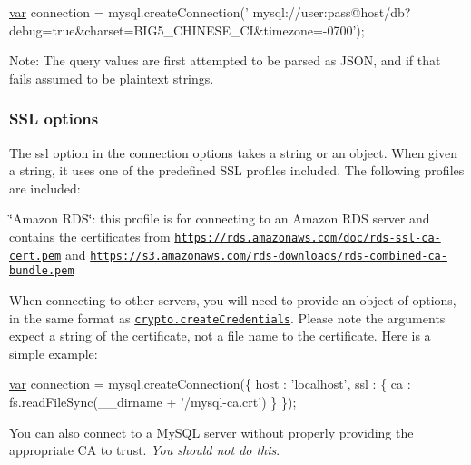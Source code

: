 \begin{DoxyCode}
\hyperlink{018__def_8c_a335628f2e9085305224b4f9cc6e95ed5}{var} connection = mysql.createConnection(\textcolor{stringliteral}{'
      mysql://user:pass@host/db?debug=true&charset=BIG5\_CHINESE\_CI&timezone=-0700'});
\end{DoxyCode}


Note\+: The query values are first attempted to be parsed as J\+S\+O\+N, and if that fails assumed to be plaintext strings.

\subsubsection*{S\+S\+L options}

The {\ttfamily ssl} option in the connection options takes a string or an object. When given a string, it uses one of the predefined S\+S\+L profiles included. The following profiles are included\+:


\begin{DoxyItemize}
\item {\ttfamily \char`\"{}\+Amazon R\+D\+S\char`\"{}}\+: this profile is for connecting to an Amazon R\+D\+S server and contains the certificates from \href{https://rds.amazonaws.com/doc/rds-ssl-ca-cert.pem}{\tt https\+://rds.\+amazonaws.\+com/doc/rds-\/ssl-\/ca-\/cert.\+pem} and \href{https://s3.amazonaws.com/rds-downloads/rds-combined-ca-bundle.pem}{\tt https\+://s3.\+amazonaws.\+com/rds-\/downloads/rds-\/combined-\/ca-\/bundle.\+pem}
\end{DoxyItemize}

When connecting to other servers, you will need to provide an object of options, in the same format as \href{http://nodejs.org/api/crypto.html#crypto_crypto_createcredentials_details}{\tt crypto.\+create\+Credentials}. Please note the arguments expect a string of the certificate, not a file name to the certificate. Here is a simple example\+:


\begin{DoxyCode}
\hyperlink{018__def_8c_a335628f2e9085305224b4f9cc6e95ed5}{var} connection = mysql.createConnection(\{
  host : \textcolor{stringliteral}{'localhost'},
  ssl  : \{
    ca : fs.readFileSync(\_\_dirname + \textcolor{stringliteral}{'/mysql-ca.crt'})
  \}
\});
\end{DoxyCode}


You can also connect to a My\+S\+Q\+L server without properly providing the appropriate C\+A to trust. {\itshape You should not do this}.


